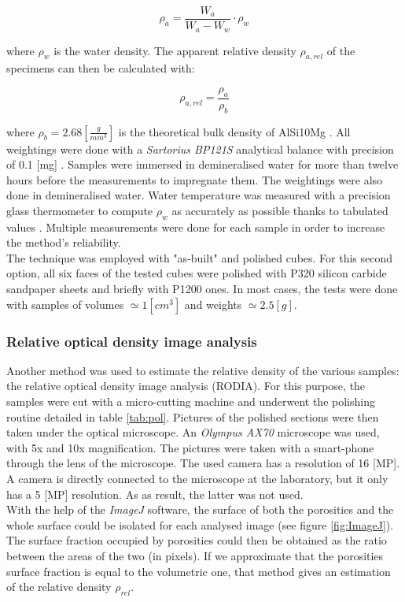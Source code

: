 $$\rho_a=\frac{W_a}{W_a-W_w} \cdot \rho_w $$

where $\rho_w$ is the water density. The apparent relative density $\rho_{a,rel}$ of the specimens can then be calculated with:

$$\rho_{a,rel} = \frac{\rho_a}{\rho_b} $$

where $\rho_b = 2.68 [\frac{g}{mm^3}]$ is the theoretical bulk density of AlSi10Mg \parencite{Bulk}. All weightings were done with a \textit{Sartorius BP121S} analytical balance with precision of 0.1 [mg] \parencite{Balance}. Samples were immersed in demineralised water for more than twelve hours before the measurements to impregnate them. The weightings were also done in demineralised water. Water temperature was measured with a precision glass thermometer to compute $\rho_w$ as accurately as possible thanks to tabulated values \parencite{Eau}. Multiple measurements were done for each sample in order to increase the method's reliability. \\

The technique was employed with "as-built" and polished cubes. For this second option, all six faces of the tested cubes were polished with P320 silicon carbide sandpaper sheets and briefly with P1200 ones. In most cases, the tests were done with samples of volumes $\simeq 1 [cm^3]$ and weights $\simeq 2.5 [g]$.\\

\subsubsection{Relative optical density image analysis}

Another method was used to estimate the relative density of the various samples: the relative optical density image analysis (RODIA). For this purpose, the samples were cut with a micro-cutting machine and underwent the polishing routine detailed in table \ref{tab:pol}. Pictures of the polished sections were then taken under the optical microscope. An \textit{Olympus AX70} microscope was used, with 5x and 10x magnification. The pictures were taken with a smart-phone through the lens of the microscope. The used camera has a resolution of 16 [MP]. A camera is directly connected to the microscope at the laboratory, but it only has a 5 [MP] resolution. As as result, the latter was not used. \\

With the help of the \textit{ImageJ} software, the surface of both the porosities and the whole surface could be isolated for each analysed image (see figure \ref{fig:ImageJ}). The surface fraction occupied by porosities could then be obtained as the ratio between the areas of the two (in pixels). If we approximate that the porosities surface fraction is equal to the volumetric one, that method gives an estimation of the relative density $\rho_{rel}$.


